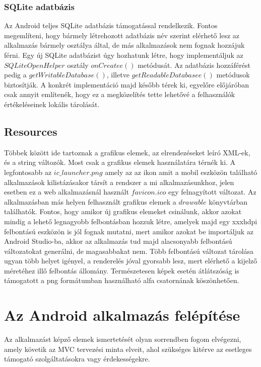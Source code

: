 \documentclass[12pt]{report}
\theoremstyle{definition}
\begin{document}
	\subsubsection{SQLite adatbázis}
	Az Android teljes SQLite adatbázis támogatással rendelkezik. Fontos megemlíteni, hogy bármely létrehozott adatbázis név szerint elérhető lesz az alkalmazás bármely osztálya által, de más alkalmazások nem fognak hozzájuk férni. Egy új SQLite adatbázist úgy hozhatunk létre, hogy implementáljuk az $SQLiteOpenHelper$ osztály $onCreatee\left(\right)$ metódusát. Az adatbázis hozzáférést pedig a $getWritableDatabase\left(\right)$, illetve \linebreak$getReadableDatabasee\left(\right)$ metódusok biztosítják. A konkrét implementáció majd később térek ki, egyelőre előjáróban csak annyit említenék, hogy ez a megközelítés tette lehetővé a felhasználók értékeléseinek lokális tárolását.
	
	\subsection*{Resources}
	Többek között ide tartoznak a grafikus elemek, az elrendezéseket leíró XML-ek, és a string változók. Most csak a grafikus elemek használatára térnék ki. A legfontosabb az $ic\_launcher.png$ amely az az ikon amit a mobil eszközön található alkalmazások kilistázásakor társít a rendszer a mi alkalmazásunkhoz, jelen esetben ez a web alkalmazásnál használt $favicon.ico$ egy felnagyított változat. Az alkalmazásban más helyen felhasznált grafikus elemek a $drawable$ könyvtárban találhatók. Fontos, hogy amikor új grafikus elemeket csinálunk, akkor azokat mindig a lehető legnagyobb felbontásban hozzuk létre, amelyek majd egy xxxhdpi felbontású eszközön is jól fognak mutatni, mert amikor azokat be importáljuk az Android Studio-ba, akkor az alkalmazás tud majd alacsonyabb felbontású változatokat generálni, de magasabbakat nem. Több felbontású változat tárolása ugyan több helyet igényel, a renderelés jóval gyorsabb lesz, mert elérhető a kijelző méretéhez illő felbontás állomány. Természetesen képek esetén átlátszóság is támogatott a png formátumban használható alfa csatornának köszönhetően.
	
	\section{Az Android alkalmazás felépítése}
	Az alkalmazást képző elemek ismertetését olyan sorrendben fogom elvégezni, amely követik az MVC tervezési minta elveit, ahol szükséges kitérve az esetleges támogató szolgáltatásokra vagy érdekességekre.
	
\end{document}
